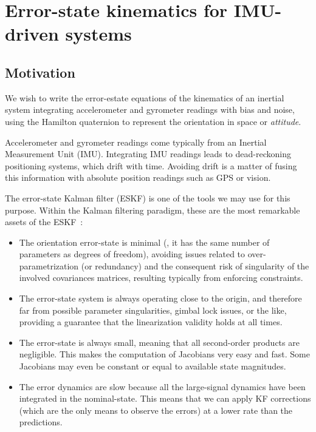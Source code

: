 

\section{Error-state kinematics for IMU-driven systems}
\label{sec:es-kinematics}

\subsection{Motivation}

We wish to write the error-estate equations of the kinematics of an inertial system integrating accelerometer and gyrometer readings with bias and noise, using the Hamilton quaternion to represent the orientation in space or \emph{attitude}. 

Accelerometer and gyrometer readings come typically from an Inertial Measurement Unit (IMU). 
Integrating IMU readings leads to dead-reckoning positioning systems, which drift with time. 
Avoiding drift is a matter of fusing this information with absolute position readings such as GPS or vision.

The error-state Kalman filter (ESKF) is one of the tools we may use for this purpose. 
Within the Kalman filtering paradigm, these are the most remarkable assets of the ESKF~\citep{MADYASTHA-11}:

\begin{itemize}
\item The orientation error-state is minimal (\ie, it has the same number of parameters as degrees of freedom), avoiding issues related to over-parametrization (or redundancy) and the consequent risk of singularity of the involved covariances matrices, resulting typically from enforcing constraints.
\item The error-state system is always operating close to the origin, and therefore far from possible parameter singularities, gimbal lock issues, or the like, providing a guarantee that the linearization validity holds at all times.
\item The error-state is always small, meaning that all second-order products are negligible. 
This makes the computation of Jacobians very easy and fast. 
Some Jacobians may  even be constant or equal to available state magnitudes.
\item The error dynamics are slow because all the large-signal dynamics have been integrated in the nominal-state. This means that we can apply KF corrections (which are the only means to observe the errors) at a lower rate than the predictions.
\end{itemize}


